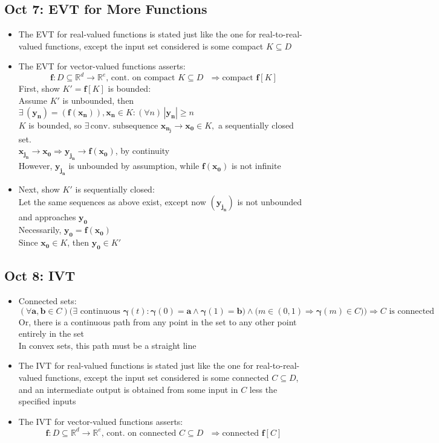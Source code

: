 \documentclass[10pt, oneside]{article}
\let\geq\geqslant
\newcommand{\R}{\mathbb{R}}
\renewcommand{\vec}[1]{\mathbf{#1}}
\newcommand{\vecf}[1]{\boldsymbol{#1}}
\begin{document}
\subsection{Oct 7: EVT for More Functions}
\begin{itemize}
    \item The EVT for real-valued functions is stated just like the one for real-to-real-valued functions, except the input set considered is some compact $K \subseteq D$
    \item The EVT for vector-valued functions asserts:
        \[\vecf{f} : D \subseteq \R^d \rightarrow \R^e \text{, cont. on compact $K \subseteq D$ } \Rightarrow \text{compact } \vecf{f}[K]\]
        First, show $K' = \vecf{f}[K]$ is bounded:\\
        Assume $K'$ is unbounded, then $\exists \, (\vec{y_n}) = (\vecf{f}(\vec{x_n})), \vec{x_n} \in K : (\forall n) \, |\vec{y_n}| \geq n$\\
        $K$ is bounded, so $\exists \, \text{conv. subsequence } \vec{x_{n_j}} \rightarrow \vec{x_0} \in K,$ a sequentially closed set.\\
        $\vec{x_{j_n}} \rightarrow \vec{x_0} \Rightarrow \vec{y_{j_n}} \rightarrow \vecf{f}(\vec{x_0})$, by continuity\\
        However, $\vec{y_{j_n}}$ is unbounded by assumption, while $\vecf{f}(\vec{x_0})$ is not infinite
    \item Next, show $K'$ is sequentially closed:\\
        Let the same sequences as above exist, except now $(\vec{y_{j_n}})$ is not unbounded and approaches $\vec{y_0}$\\
        Necessarily, $\vec{y_0} = \vecf{f}(\vec{x_0})$\\
        Since $\vec{x_0} \in K$, then $\vec{y_0} \in K'$
\end{itemize}

\subsection{Oct 8: IVT}
\begin{itemize}
    \item Connected sets:
        \[(\forall \vec{a}, \vec{b} \in C) \big(\exists \text{ continuous }\vecf{\gamma}(t) : \vecf{\gamma}(0) = \vec{a} \land \vecf{\gamma}(1) = \vec{b}) \land \big( m \in (0,1) \Rightarrow \vecf{\gamma}(m) \in C \big) \big) \Rightarrow C \text{ is connected}\]
        Or, there is a continuous path from any point in the set to any other point entirely in the set\\
        In convex sets, this path must be a straight line
    \item The IVT for real-valued functions is stated just like the one for real-to-real-valued functions, except the input set considered is some connected $C \subseteq D$, and an intermediate output is obtained from some input in $C$ less the specified inputs
    \item The IVT for vector-valued functions asserts:
        \[\vecf{f} : D \subseteq \R^d \rightarrow \R^e \text{, cont. on connected $C \subseteq D$ } \Rightarrow \text{connected } \vecf{f}[C]\]
\end{itemize}
\end{document}
